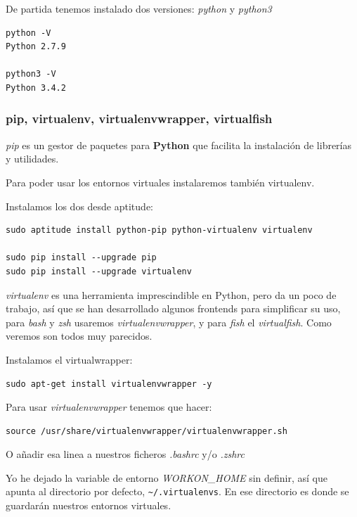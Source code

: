 \documentclass[12pt,spanish,]{scrartcl}
\begin{document}
De partida tenemos instalado dos versiones: \emph{python} y
\emph{python3}

\begin{verbatim}
python -V
Python 2.7.9

python3 -V
Python 3.4.2
\end{verbatim}

\subsubsection{pip, virtualenv, virtualenvwrapper,
virtualfish}\label{pip-virtualenv-virtualenvwrapper-virtualfish}

\emph{pip} es un gestor de paquetes para \textbf{Python} que facilita la
instalación de librerías y utilidades.

Para poder usar los entornos virtuales instalaremos también virtualenv.

Instalamos los dos desde aptitude:

\begin{verbatim}
sudo aptitude install python-pip python-virtualenv virtualenv

sudo pip install --upgrade pip
sudo pip install --upgrade virtualenv
\end{verbatim}

\emph{virtualenv} es una herramienta imprescindible en Python, pero da
un poco de trabajo, así que se han desarrollado algunos frontends para
simplificar su uso, para \emph{bash} y \emph{zsh} usaremos
\emph{virtualenvwrapper}, y para \emph{fish} el \emph{virtualfish}. Como
veremos son todos muy parecidos.

Instalamos el virtualwrapper:

\begin{verbatim}
sudo apt-get install virtualenvwrapper -y
\end{verbatim}

Para usar \emph{virtualenvwrapper} tenemos que hacer:

\begin{verbatim}
source /usr/share/virtualenvwrapper/virtualenvwrapper.sh
\end{verbatim}

O añadir esa linea a nuestros ficheros \emph{.bashrc} y/o \emph{.zshrc}

Yo he dejado la variable de entorno \emph{WORKON\_HOME} sin definir, así
que apunta al directorio por defecto,
\texttt{\textasciitilde{}/.virtualenvs}. En ese directorio es donde se
guardarán nuestros entornos virtuales.
\end{document}
